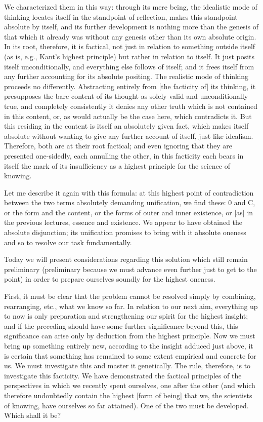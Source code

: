 We characterized them in this way:
through its mere being,
the idealistic mode of thinking locates itself
in the standpoint of reflection,
makes this standpoint absolute by itself,
and its further development is nothing more than
the genesis of that which it already was
without any genesis other than its own absolute origin.
In its root, therefore, it is factical,
not just in relation to something outside itself
(as is, e.g., Kant's highest principle)
but rather in relation to itself.
It just posits itself unconditionally,
and everything else follows of itself;
and it frees itself from any further
accounting for its absolute positing.
The realistic mode of thinking proceeds no differently.
Abstracting entirely from [the facticity of] its thinking,
it presupposes the bare content of its thought
as solely valid and unconditionally true,
and completely consistently it denies any other
truth which is not contained in this content,
or, as would actually be the case here,
which contradicts it.
But this residing in the content is
itself an absolutely given fact,
which makes itself absolute
without wanting to give any further account of itself,
just like idealism.
Therefore, both are at their root factical;
and even ignoring that they are presented one-sidedly,
each annulling the other,
in this facticity each bears in itself
the mark of its insufficiency as
a highest principle for the science of knowing.

Let me describe it again with this formula:
at this highest point of contradiction
between the two terms absolutely demanding unification,
we find these: 0 and C,
or the form and the content,
or the forms of outer and inner existence,
or [as] in the previous lectures, essence and existence.
We appear to have obtained the absolute disjunction;
its unification promises to bring with it absolute oneness
and so to resolve our task fundamentally.

Today we will present considerations
regarding this solution
which still remain preliminary
(preliminary because we must advance
even further just to get to the point)
in order to prepare ourselves soundly
for the highest oneness.

First, it must be clear that the problem
cannot be resolved simply by
combining, rearranging, etc.,
what we know so far.
In relation to our next aim,
everything up to now is only
preparation and strengthening our spirit
for the highest insight;
and if the preceding should have
some further significance beyond this,
this significance can arise only
by deduction from the highest principle.
Now we must bring up something entirely new,
according to the insight adduced just above,
it is certain that something has remained
to some extent empirical and concrete for us.
We must investigate this and master it genetically.
The rule, therefore, is to investigate this facticity.
We have demonstrated the factical principles
of the perspectives in which we recently spent ourselves,
one after the other
(and which therefore undoubtedly contain
the highest [form of being] that we,
the scientists of knowing,
have ourselves so far attained).
One of the two must be developed.
Which shall it be?

